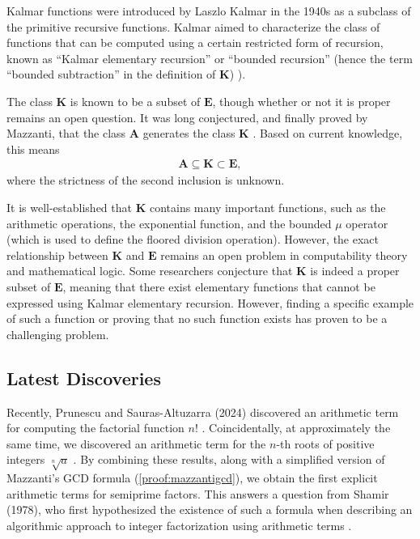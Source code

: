 \documentclass[11pt,reqno]{article}
\theoremstyle{plain}
\theoremstyle{definition}
\begin{document}
Kalmar functions were introduced by Laszlo Kalmar in the 1940s as a subclass of the primitive recursive functions. Kalmar aimed to characterize the class of functions that can be computed using a certain restricted form of recursion, known as ``Kalmar elementary recursion'' or ``bounded recursion'' (hence the term ``bounded subtraction'' in the definition of $\textbf{K}$) \cite{herman1969elementary}).

The class $\textbf{K}$ is known to be a subset of $\textbf{E}$, though whether or not it is proper remains an open question. It was long conjectured, and finally proved by Mazzanti, that the class $\textbf{A}$ generates the class $\textbf{K}$ \cite{mazzanti2002plainbases, marchenkov2007superposition}. Based on current knowledge, this means
\begin{align*}
    \textbf{A} \subseteq \textbf{K} \subset \textbf{E} ,
\end{align*}
where the strictness of the second inclusion is unknown.

It is well-established that $\textbf{K}$ contains many important functions, such as the arithmetic operations, the exponential function, and the bounded $\mu$ operator (which is used to define the floored division operation). However, the exact relationship between $\textbf{K}$ and $\textbf{E}$ remains an open problem in computability theory and mathematical logic. Some researchers conjecture that $\textbf{K}$ is indeed a proper subset of $\textbf{E}$, meaning that there exist elementary functions that cannot be expressed using Kalmar elementary recursion. However, finding a specific example of such a function or proving that no such function exists has proven to be a challenging problem.

\subsection{Latest Discoveries}

Recently, Prunescu and Sauras-Altuzarra (2024) discovered an arithmetic term for computing the factorial function $n!$ \cite{prunescu2024factorial}. Coincidentally, at approximately the same time, we discovered an arithmetic term for the $n$-th roots of positive integers $\sqrt[n]{a}$ \cite{shunia2024polynomial}. By combining these results, along with a simplified version of Mazzanti's GCD formula (\cref{proof:mazzantigcd}), we obtain the first explicit arithmetic terms for semiprime factors. This answers a question from Shamir (1978), who first hypothesized the existence of such a formula when describing an algorithmic approach to integer factorization using arithmetic terms \cite{shamir1978factoring}.
\end{document}
